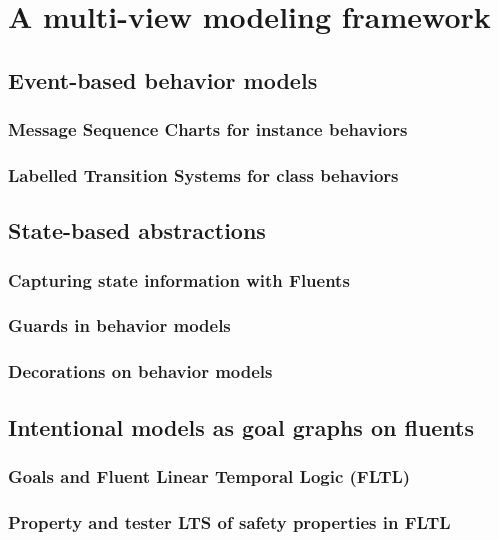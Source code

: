 \chapter{A multi-view modeling framework\label{chapter:framework}}
  \section{Event-based behavior models}
    \subsection{Message Sequence Charts for instance behaviors}
    \subsection{Labelled Transition Systems for class behaviors}
  \section{State-based abstractions}
    \subsection{Capturing state information with Fluents}
    \subsection{Guards in behavior models}
    \subsection{Decorations on behavior models}
  \section{Intentional models as goal graphs on fluents}
    \subsection{Goals and Fluent Linear Temporal Logic (FLTL)}
    \subsection{Property and tester LTS of safety properties in FLTL}

